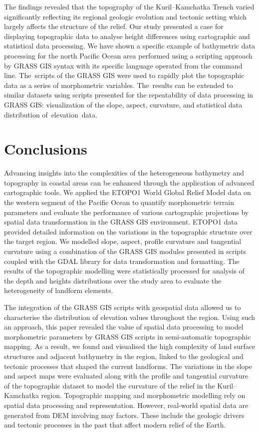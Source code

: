 \documentclass[technologies,article,accept,pdftex,moreauthors]{Definitions/mdpi}
\begin{document}
The findings revealed that the topography of the Kuril--Kamchatka Trench varied significantly reflecting its regional geologic evolution and tectonic setting which largely affects the structure of the relief. Our study presented a case for displaying topographic data to analyse height differences using cartographic and statistical data processing. We have shown a specific example of bathymetric data processing for the north Pacific Ocean area performed using a scripting approach by GRASS GIS syntax with its specific language operated from the command line. The~scripts of the GRASS GIS were used to rapidly plot the topographic data as a series of morphometric variables. The~results can be extended to similar datasets using scripts presented for the repeatability of data processing in GRASS GIS: visualization of the slope, aspect, curvature, and statistical data distribution \mbox{of elevation~data}.

\section{Conclusions}

Advancing insights into the complexities of the heterogeneous bathymetry and topography in coastal areas can be enhanced through the application of advanced cartographic tools. We applied the ETOPO1 World Global Relief Model data on the western segment of the Pacific Ocean to quantify morphometric terrain parameters and evaluate the performance of various cartographic projections by spatial data transformation in the GRASS GIS environment. ETOPO1 data provided detailed information on the variations in the topographic structure over the target region. We modelled slope, aspect, profile curvature and tangential curvature using a combination of the GRASS GIS modules presented in scripts coupled with the GDAL library for data transformation and formatting. The results of the topographic modelling were statistically processed for analysis of the depth and heights distributions over the study area to evaluate the heterogeneity of landform elements.

The integration of the GRASS GIS scripts with geospatial data allowed us to characterise the distribution of elevation values throughout the region. Using such an approach, this paper revealed the value of spatial data processing to model morphometric parameters by GRASS GIS scripts in semi-automatic topographic mapping. As a result, we found and visualised the high complexity of land surface structures and adjacent bathymetry in the region, linked to the geological and tectonic processes that shaped the current landforms. The variations in the slope and aspect maps were evaluated along with the profile and tangential curvature of the topographic dataset to model the curvature of the relief in the Kuril--Kamchatka region. Topographic mapping and morphometric modelling rely on spatial data processing and representation. However, real-world spatial data are generated from DEM involving may factors. These include the geologic drivers and tectonic processes in the past that affect modern relief of the Earth. 
\end{document}
